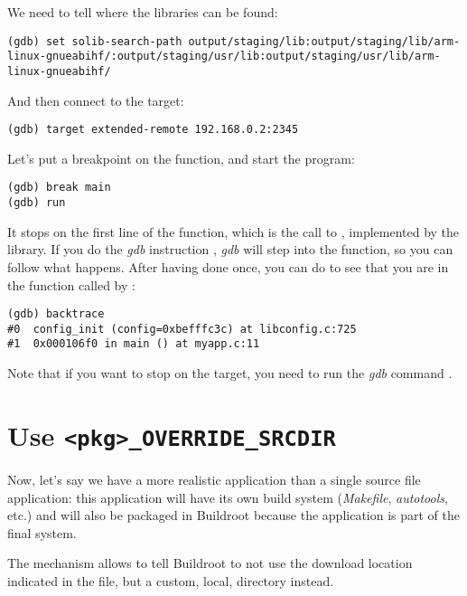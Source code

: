 We need to tell  where the libraries can be found:

\begin{verbatim}
(gdb) set solib-search-path output/staging/lib:output/staging/lib/arm-linux-gnueabihf/:output/staging/usr/lib:output/staging/usr/lib/arm-linux-gnueabihf/
\end{verbatim}

And then connect to the target:

\begin{verbatim}
(gdb) target extended-remote 192.168.0.2:2345
\end{verbatim}

Let's put a breakpoint on the  function, and start the
program:

\begin{verbatim}
(gdb) break main
(gdb) run
\end{verbatim}

It stops on the first line of the  function, which is the
call to , implemented by the 
library. If you do the {\em gdb} instruction , {\em gdb}
will step into the function, so you can follow what happens. After
having done  once, you can do  to see that
you are in the function  called by :

\begin{verbatim}
(gdb) backtrace
#0  config_init (config=0xbefffc3c) at libconfig.c:725
#1  0x000106f0 in main () at myapp.c:11
\end{verbatim}

Note that if you want  to stop on the target, you need
to run the {\em gdb} command .

\section{Use {\tt <pkg>\_OVERRIDE\_SRCDIR}}

Now, let's say we have a more realistic application than a single
source file application: this application will have its own build
system ({\em Makefile}, {\em autotools}, etc.) and will also be
packaged in Buildroot because the application is part of the final
system.

The  mechanism allows to tell Buildroot to
not use the download location indicated in the  file, but a
custom, local, directory instead.

